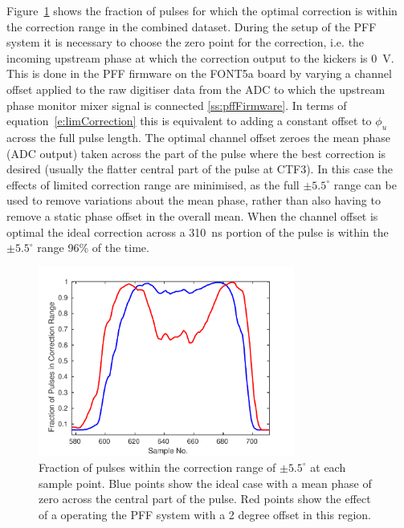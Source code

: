 Figure~\ref{f:longFF_fractInRange} shows the fraction of pulses for which the optimal correction is within the correction range in the combined dataset. During the setup of the PFF system it is necessary to choose the zero point for the correction, i.e. the incoming upstream phase at which the correction output to the kickers is 0~V. This is done in the PFF firmware on the FONT5a board by varying a channel offset applied to the raw digitiser data from the ADC to which the upstream phase monitor mixer signal is connected \ref{ss:pffFirmware}. In terms of equation~\ref{e:limCorrection} this is equivalent to adding a constant offset to \(\phi_u\) across the full pulse length. The optimal channel offset zeroes the mean phase (ADC output) taken across the part of the pulse where the best correction is desired (usually the flatter central part of the pulse at CTF3). In this case the effects of limited correction range are minimised, as the full \(\pm5.5^\circ\) range can be used to remove variations about the mean phase, rather than also having to remove a static phase offset in the overall mean. When the channel offset is optimal the ideal correction across a 310~ns portion of the pulse is within the \(\pm5.5^\circ\) range 96\% of the time.

\begin{figure}
  \centering
  \includegraphics[width=0.75\textwidth]{Figures/feedforward/longFF_fractInRange}
  \caption{Fraction of pulses within the correction range of \(\pm 5.5^\circ\) at each sample point. Blue points show the ideal case with a mean phase of zero across the central part of the pulse. Red points show the effect of a operating the PFF system with a 2 degree offset in this region.}
  \label{f:longFF_fractInRange}
\end{figure}

